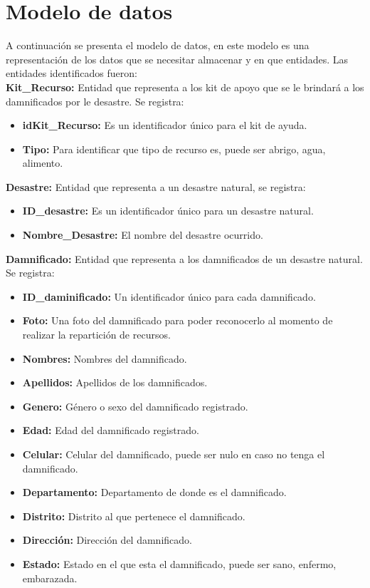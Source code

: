 \documentclass[11pt,openany]{book}
\begin{document}
	\section{Modelo de datos}
	A continuación se presenta el modelo de datos, en este modelo es una representación de los datos que se necesitar almacenar y en que entidades. Las entidades identificados fueron:\\[0.25cm]
	\textbf{Kit\_Recurso: }Entidad que representa a los kit de apoyo que se le brindará a los damnificados por le desastre. Se registra:
	\begin{itemize}
		\item \textbf{idKit\_Recurso: }Es un identificador único para el kit de ayuda.
		\item \textbf{Tipo: }Para identificar que tipo de recurso es, puede ser abrigo, agua, alimento.
	\end{itemize}
	\textbf{Desastre: }Entidad que representa a un desastre natural, se registra:
	\begin{itemize}
		\item \textbf{ID\_desastre: }Es un identificador único para un desastre natural.
		\item \textbf{Nombre\_Desastre: }El nombre del desastre ocurrido. 
	\end{itemize}
	\textbf{Damnificado: }Entidad que representa a los damnificados de un desastre natural. Se registra:
	\begin{itemize} 
		\item \textbf{ID\_daminificado: }Un identificador único para cada damnificado.
		\item \textbf{Foto: }Una foto del damnificado para poder reconocerlo al momento de realizar la repartición de recursos.
		\item \textbf{Nombres: }Nombres del damnificado.
		\item \textbf{Apellidos: }Apellidos de los damnificados.
		\item \textbf{Genero: }Género o sexo del damnificado registrado.
		\item \textbf{Edad: }Edad del damnificado registrado.
		\item \textbf{Celular: }Celular del damnificado, puede ser nulo en caso no tenga el damnificado.
		\item \textbf{Departamento: }Departamento de donde es el damnificado.
		\item \textbf{Distrito: }Distrito al que pertenece el damnificado.
		\item \textbf{Dirección: }Dirección del damnificado.
		\item \textbf{Estado: }Estado en el que esta el damnificado, puede ser sano, enfermo, embarazada.
	\end{itemize}
\end{document}
